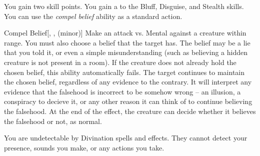              You gain two skill points.
             You gain a   to the Bluff, Disguise, and Stealth skills.
             You can use the \textit{compel belief} ability as a standard action.
            \begin{apability}{Compel Belief}[, ,  (minor)]
                Make an attack vs. Mental against a creature within \rngmed range.
                You must also choose a belief that the target has.
                The belief may be a lie that you told it, or even a simple misunderstanding (such as believing a hidden creature is not present in a room).
                If the creature does not already hold the chosen belief, this ability automatically fails.
                \hit The target continues to maintain the chosen belief, regardless of any evidence to the contrary.
                It will interpret any evidence that the falsehood is incorrect to be somehow wrong -- an illusion, a conspiracy to decieve it, or any other reason it can think of to continue believing the falsehood.
                At the end of the effect, the creature can decide whether it believes the falsehood or not, as normal.
            \end{apability}
             You are undetectable by Divination spells and effects.
            They cannot detect your presence, sounds you make, or any actions you take.

